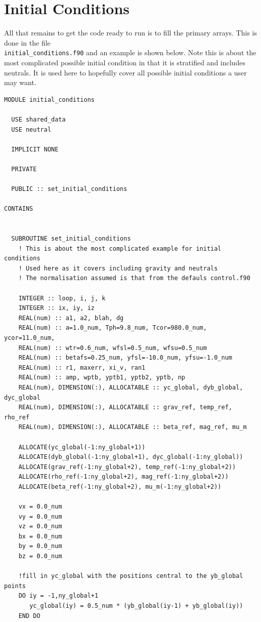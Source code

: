 \documentclass[11pt]{article}
\begin{document}
\section{Initial Conditions}
All that remains to get the code ready to run is to fill the primary arrays. This is done in the file \\ \texttt{initial\_conditions.f90} and an example is shown below. Note this is about the most complicated possible initial condition in that it is stratified and includes neutrals. It is used here to hopefully cover all possible initial conditions a user may want.  
\begin{verbatim}
MODULE initial_conditions

  USE shared_data
  USE neutral

  IMPLICIT NONE

  PRIVATE

  PUBLIC :: set_initial_conditions

CONTAINS


  SUBROUTINE set_initial_conditions
    ! This is about the most complicated example for initial conditions
    ! Used here as it covers including gravity and neutrals
    ! The normalisation assumed is that from the defauls control.f90    

    INTEGER :: loop, i, j, k
    INTEGER :: ix, iy, iz
    REAL(num) :: a1, a2, blah, dg
    REAL(num) :: a=1.0_num, Tph=9.8_num, Tcor=980.0_num, ycor=11.0_num, 
    REAL(num) :: wtr=0.6_num, wfsl=0.5_num, wfsu=0.5_num
    REAL(num) :: betafs=0.25_num, yfsl=-10.0_num, yfsu=-1.0_num
    REAL(num) :: r1, maxerr, xi_v, ran1
    REAL(num) :: amp, wptb, yptb1, yptb2, yptb, np
    REAL(num), DIMENSION(:), ALLOCATABLE :: yc_global, dyb_global, dyc_global
    REAL(num), DIMENSION(:), ALLOCATABLE :: grav_ref, temp_ref, rho_ref
    REAL(num), DIMENSION(:), ALLOCATABLE :: beta_ref, mag_ref, mu_m

    ALLOCATE(yc_global(-1:ny_global+1))
    ALLOCATE(dyb_global(-1:ny_global+1), dyc_global(-1:ny_global))
    ALLOCATE(grav_ref(-1:ny_global+2), temp_ref(-1:ny_global+2))
    ALLOCATE(rho_ref(-1:ny_global+2), mag_ref(-1:ny_global+2))
    ALLOCATE(beta_ref(-1:ny_global+2), mu_m(-1:ny_global+2))

    vx = 0.0_num
    vy = 0.0_num
    vz = 0.0_num
    bx = 0.0_num
    by = 0.0_num
    bz = 0.0_num

    !fill in yc_global with the positions central to the yb_global points
    DO iy = -1,ny_global+1
       yc_global(iy) = 0.5_num * (yb_global(iy-1) + yb_global(iy))
    END DO


\end{verbatim}
\end{document}
